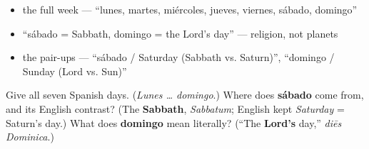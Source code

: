 \begin{itemize}
\raggedright
  \item the full week — \textquotedblleft{}lunes, martes, miércoles, jueves, viernes, sábado, domingo\textquotedblright{}
  \item \textquotedblleft{}sábado = Sabbath, domingo = the Lord's day\textquotedblright{} — religion, not planets
  \item the pair-ups — \textquotedblleft{}sábado / Saturday (Sabbath vs. Saturn)\textquotedblright{}, \textquotedblleft{}domingo / Sunday (Lord vs. Sun)\textquotedblright{}
\end{itemize}

\begin{tcolorbox}[breakable,colback=teal!4,colframe=teal!35!black,title={Before you move on}]
Give all seven Spanish days. (\emph{Lunes … domingo}.) Where does \textbf{sábado} come from, and its English contrast? (The \textbf{Sabbath}, \emph{Sabbatum}; English kept \emph{Saturday} = Saturn's day.) What does \textbf{domingo} mean literally? (\textquotedblleft{}The \textbf{Lord's} day,\textquotedblright{} \emph{diēs Dominica}.)
\end{tcolorbox}
